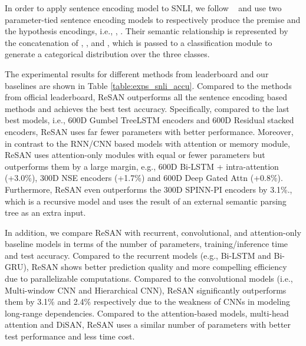 \documentclass{article}
\begin{document}
In order to apply sentence encoding model to SNLI, we follow  \citeauthor{bowman2016fast}~ and use two parameter-tied sentence encoding models to respectively produce the premise and the hypothesis encodings, i.e., , . Their semantic relationship is represented by the concatenation of , ,  and , which is passed to a classification module to generate a categorical distribution over the three classes. 

The experimental results for different methods from leaderboard and our baselines are shown in Table \ref{table:exps_snli_accu}. Compared to the methods from official leaderboard, ReSAN outperforms all the sentence encoding based methods and achieves the best test accuracy. Specifically, compared to the last best models, i.e., 600D Gumbel TreeLSTM encoders and 600D Residual stacked encoders, ReSAN uses far fewer parameters with better performance. Moreover, in contrast to the RNN/CNN based models with attention or memory module, ReSAN uses attention-only modules with equal or fewer parameters but outperforms them by a large margin, e.g., 600D Bi-LSTM + intra-attention (+3.0\%), 300D NSE encoders (+1.7\%) and 600D Deep Gated Attn (+0.8\%). Furthermore, ReSAN even outperforms the 300D SPINN-PI encoders by 3.1\%., which is a recursive model and uses the result of an external semantic parsing tree as an extra input.

In addition, we compare ReSAN with recurrent, convolutional, and attention-only baseline models in terms of the number of parameters, training/inference time and test accuracy. Compared to the recurrent models (e.g., Bi-LSTM and Bi-GRU), ReSAN shows better prediction quality and more compelling efficiency due to parallelizable computations. Compared to the convolutional models (i.e., Multi-window CNN and Hierarchical CNN), ReSAN significantly outperforms them by 3.1\% and 2.4\% respectively due to the weakness of CNNs in modeling long-range dependencies. Compared to the attention-based models,  multi-head attention and DiSAN, ReSAN uses a similar number of  parameters with better test performance and less time cost.
\end{document}
